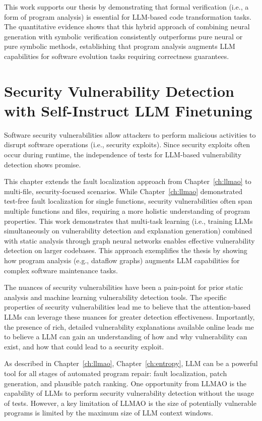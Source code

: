 \documentclass[12pt,openany,oneside,table]{cmuthesis}
\begin{document}
This work supports our thesis by demonstrating that formal verification (i.e., a form of program analysis) is essential for LLM-based code transformation tasks. The quantitative evidence shows that this hybrid approach of combining neural generation with symbolic verification consistently outperforms pure neural or pure symbolic methods, establishing that program analysis augments LLM capabilities for software evolution tasks requiring correctness guarantees.


\chapter{Security Vulnerability Detection with Self-Instruct LLM Finetuning}
\label{ch:msivd}
Software security vulnerabilities allow attackers to perform malicious activities to disrupt software operations (i.e., security exploits). Since security exploits often occur during runtime, the independence of tests for LLM-based vulnerability detection shows promise.

This chapter extends the fault localization approach from Chapter~\ref{ch:llmao} to multi-file, security-focused scenarios. While Chapter~\ref{ch:llmao} demonstrated test-free fault localization for single functions, security vulnerabilities often span multiple functions and files, requiring a more holistic understanding of program properties. This work demonstrates that multi-task learning (i.e., training LLMs simultaneously on vulnerability detection and explanation generation) combined with static analysis through graph neural networks enables effective vulnerability detection on larger codebases. This approach exemplifies the thesis by showing how program analysis (e.g., dataflow graphs) augments LLM capabilities for complex software maintenance tasks.

The nuances of security vulnerabilities have been a pain-point for prior static analysis and machine learning vulnerability detection tools. The specific properties of security vulnerabilities lead me to believe that the attention-based LLMs can leverage these nuances for greater detection effectiveness. Importantly, the presence of rich, detailed vulnerability explanations available online leads me to believe a LLM can gain an understanding of how and why vulnerability can exist, and how that could lead to a security exploit. 

As described in Chapter~\ref{ch:llmao}, Chapter~\ref{ch:entropy}, LLM can be a powerful tool for all stages of automated program repair: fault localization, patch generation, and plausible patch ranking. One opportunity from LLMAO is the capability of LLMs to perform security vulnerability detection without the usage of tests. 
However, a key limitation of LLMAO is the size of potentially vulnerable programs is limited by the maximum size of LLM context windows.
\end{document}
